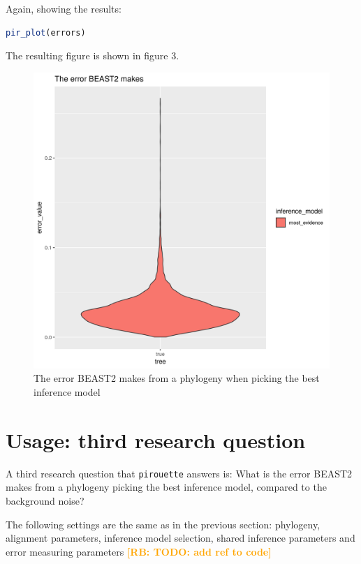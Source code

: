 \documentclass{article}
\newcommand{\richel}[1]{\textcolor{orange}{\textbf{[RB: #1]}}}
\begin{document}
Again, showing the results:

\begin{lstlisting}[language=R, floatplacement=H, frame=single]
pir_plot(errors)
\end{lstlisting}

The resulting figure is shown in figure 3.

\begin{figure}[h]
  \includegraphics[width=\textwidth]{figure_3.png}
  \caption{
    The error BEAST2 makes from a phylogeny when
    picking the best inference model
  }
\end{figure}

\section{Usage: third research question}

A third research question that \verb;pirouette; answers is:
What is the error BEAST2 makes from a phylogeny 
picking the best inference model, compared to the background noise?

The following settings are the same as in the previous section:
phylogeny, alignment parameters, inference model selection,
shared inference parameters and error measuring parameters 
\richel{TODO: add ref to code}
\end{document}

